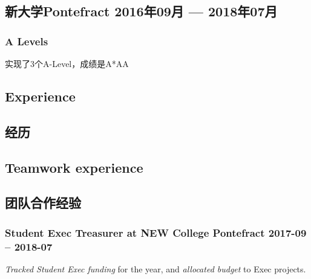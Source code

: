 \documentclass[cv_en.tex]{subfiles}
\begin{document}
\begin{xcn}
        \subsection{新大学Pontefract
            \hfill 2016年09月 --- 2018年07月}
            \subsubsection{A Levels}
            实现了3个A-Level，成绩是A*AA
\end{xcn}
\begin{xen}
\section{Experience}
\end{xen}
\begin{xcn}
\section{经历}
\end{xcn}
\begin{xen}
    \subsection{Teamwork experience}
\end{xen}
\begin{xcn}
    \subsection{团队合作经验}
\end{xcn}
\begin{xen}
        \subsubsection{Student Exec Treasurer at NEW College Pontefract
        \hfill 2017-09 -- 2018-07}
                \emph{Tracked Student Exec funding} for the year, and
                \emph{allocated budget} to Exec projects.
\end{xen}
\end{document}
